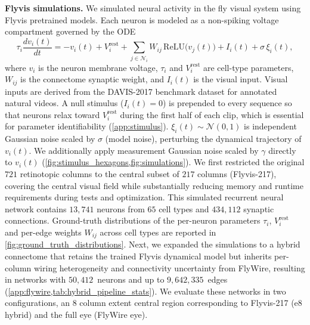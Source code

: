 \documentclass{article}
\begin{document}
\textbf{Flyvis simulations.}\label{sec:simulation}
We simulated neural activity in the fly visual system using Flyvis pretrained models.  Each neuron is modeled as a non-spiking voltage compartment governed by the ODE
\begin{equation}
\tau_i\frac{dv_i(t)}{dt} = -v_i(t) + V_i^{\text{rest}}
+ \sum_{j\in\mathcal{N}_i}W_{ij}\,\text{ReLU}\!\big(v_j(t)\big)
+ I_i(t) + \sigma\,\xi_i(t),
\label{eq:simulated_update}
\end{equation}
where $v_i$ is the neuron membrane voltage, $\tau_i$ and
$V_i^{\mathrm{rest}}$ are cell-type parameters, $W_{ij}$ is the
connectome synaptic weight, and $I_i(t)$ is the visual input. Visual
inputs are derived from the DAVIS-2017 benchmark dataset
\citep{perazzi_benchmark_2016} for annotated
natural videos. A null
stimulus ($I_i(t)=0$) is prepended to every sequence so that neurons
relax toward $V_i^{\mathrm{rest}}$ during the first half of each clip,
which is essential for parameter identifiability
(\cref{app:stimulus}). $\xi_i(t)\sim\mathcal{N}(0,1)$ is
independent Gaussian noise scaled by $\sigma$ (model noise), perturbing
the dynamical trajectory of $v_i(t)$. We additionally apply
measurement Gaussian noise scaled by
$\gamma$ directly to $v_i(t)$ (\cref{fig:stimulus_hexagons,fig:simulations}).  We first restricted the original $721$
retinotopic columns to the central subset of $217$
columns (Flyvis-217), covering the central visual field while substantially reducing memory and runtime requirements during tests and optimization. This simulated recurrent neural network contains $13{,}741$ neurons from $65$ cell types and $434{,}112$ synaptic connections. Ground-truth distributions of the per-neuron parameters $\tau_i$, $V_i^{\mathrm{rest}}$ and per-edge weights $W_{ij}$ across cell types are reported in \cref{fig:ground_truth_distributions}. Next, we expanded the simulations to a hybrid connectome that retains the trained Flyvis dynamical model but inherits per-column wiring heterogeneity and connectivity uncertainty from FlyWire, resulting in networks with $50{,}412$~neurons and up to $9{,}642{,}335$~edges (\cref{app:flywire,tab:hybrid_pipeline_stats}).  We evaluate these networks in two configurations, an 8 column extent central region corresponding to Flyvis-217 (e8 hybrid) and the full eye (FlyWire eye). 
\end{document}
